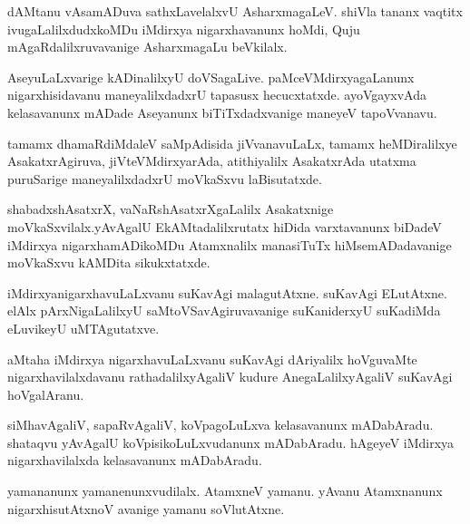 \documentclass{article}
\begin{document}
\begin{mn}
dAMtanu  vAsamADuva  sathxLavelalxvU  AsharxmagaLeV.  shiVla  tananx  vaqtitx  ivugaLalilxdudxkoMDu  
iMdirxya nigarxhavanunx  hoMdi,  Quju  mAgaRdalilxruvavanige  AsharxmagaLu  beVkilalx.
\end{mn}

\begin{mn}
AseyuLaLxvarige  kADinalilxyU  doVSagaLive.  paMceVMdirxyagaLanunx  nigarxhisidavanu  
maneyalilxdadxrU  tapasusx  hecucxtatxde.  ayoVgayxvAda  kelasavanunx  mADade  Aseyanunx  
biTiTxdadxvanige  maneyeV  tapoVvanavu.
\end{mn}

\begin{mn}
tamamx  dhamaRdiMdaleV  saMpAdisida  jiVvanavuLaLx,  tamamx  heMDiralilxye  
AsakatxrAgiruva,  jiVteVMdirxyarAda,  atithiyalilx  AsakatxrAda  utatxma  
puruSarige  maneyalilxdadxrU  moVkaSxvu  laBisutatxde.
\end{mn}

\begin{mn}
shabadxshAsatxrX,  vaNaRshAsatxrXgaLalilx  Asakatxnige  moVkaSxvilalx.yAvAgalU  
EkAMtadalilxrutatx  hiDida  varxtavanunx  biDadeV  iMdirxya  nigarxhamADikoMDu  
Atamxnalilx  manasiTuTx  hiMsemADadavanige  moVkaSxvu  kAMDita  sikukxtatxde.
\end{mn}

\begin{mn}
iMdirxyanigarxhavuLaLxvanu  suKavAgi  malagutAtxne.  suKavAgi  ELutAtxne.  elAlx  
pArxNigaLalilxyU  saMtoVSavAgiruvavanige  suKaniderxyU  suKadiMda  eLuvikeyU  uMTAgutatxve.
\end{mn}

\begin{mn}
aMtaha  iMdirxya nigarxhavuLaLxvanu  suKavAgi  dAriyalilx  hoVguvaMte  nigarxhavilalxdavanu  
rathadalilxyAgaliV  kudure  AnegaLalilxyAgaliV  suKavAgi  hoVgalAranu.
\end{mn}

\begin{mn}
siMhavAgaliV,  sapaRvAgaliV,  koVpagoLuLxva  kelasavanunx  mADabAradu.  shataqvu  yAvAgalU  
koVpisikoLuLxvudanunx  mADabAradu.  hAgeyeV  iMdirxya nigarxhavilalxda  kelasavanunx  mADabAradu.
\end{mn}

\begin{mn}
yamananunx  yamanenunxvudilalx.  AtamxneV  yamanu.  yAvanu  Atamxnanunx  nigarxhisutAtxnoV  
avanige  yamanu  soVlutAtxne.
\end{mn}
\end{document}
